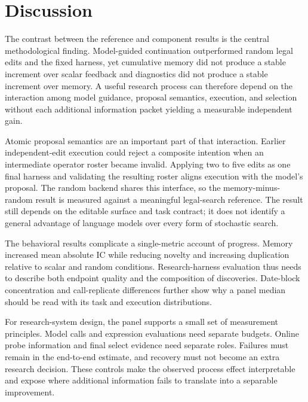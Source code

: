 \section{Discussion}
\label{sec:discussion}

The contrast between the reference and component results is the central methodological finding. Model-guided continuation outperformed random legal edits and the fixed harness, yet cumulative memory did not produce a stable increment over scalar feedback and diagnostics did not produce a stable increment over memory. A useful research process can therefore depend on the interaction among model guidance, proposal semantics, execution, and selection without each additional information packet yielding a measurable independent gain.

Atomic proposal semantics are an important part of that interaction. Earlier independent-edit execution could reject a composite intention when an intermediate operator roster became invalid. Applying two to five edits as one final harness and validating the resulting roster aligns execution with the model's proposal. The random backend shares this interface, so the memory-minus-random result is measured against a meaningful legal-search reference. The result still depends on the editable surface and task contract; it does not identify a general advantage of language models over every form of stochastic search.

The behavioral results complicate a single-metric account of progress. Memory increased mean absolute IC while reducing novelty and increasing duplication relative to scalar and random conditions. Research-harness evaluation thus needs to describe both endpoint quality and the composition of discoveries. Date-block concentration and call-replicate differences further show why a panel median should be read with its task and execution distributions.

For research-system design, the panel supports a small set of measurement principles. Model calls and expression evaluations need separate budgets. Online probe information and final select evidence need separate roles. Failures must remain in the end-to-end estimate, and recovery must not become an extra research decision. These controls make the observed process effect interpretable and expose where additional information fails to translate into a separable improvement.
